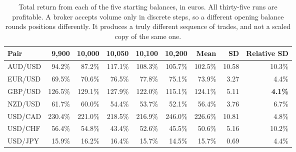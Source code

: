 \begin{table}[htb!]
\centering
\footnotesize
\caption{Total return from each of the five starting balances, in euros. All thirty-five runs are profitable. A broker accepts volume only in discrete steps, so a different opening balance rounds positions differently. It produces a truly different sequence of trades, and not a scaled copy of the same one.}
\label{Tables:PathRobustness}
\begin{tabular}{@{}lrrrrrrrr@{}}
\toprule
\textbf{Pair} & \textbf{9,900} & \textbf{10,000} & \textbf{10,050} & \textbf{10,100} & \textbf{10,200} & \textbf{Mean} & \textbf{SD} & \textbf{Relative SD} \\
\midrule
AUD/USD & 94.2\% & 87.2\% & 117.1\% & 108.3\% & 105.7\% & 102.5\% & 10.58 & 10.3\% \\
EUR/USD & 69.5\% & 70.6\% & 76.5\% & 77.8\% & 75.1\% & 73.9\% & 3.27 & 4.4\% \\
GBP/USD & 126.5\% & 129.1\% & 127.9\% & 122.0\% & 115.1\% & 124.1\% & 5.11 & \textbf{4.1\%} \\
NZD/USD & 61.7\% & 60.0\% & 54.4\% & 53.7\% & 52.1\% & 56.4\% & 3.76 & 6.7\% \\
USD/CAD & 230.4\% & 221.0\% & 218.5\% & 216.9\% & 246.0\% & 226.6\% & 10.81 & 4.8\% \\
USD/CHF & 56.4\% & 54.8\% & 43.4\% & 52.6\% & 45.5\% & 50.6\% & 5.16 & 10.2\% \\
USD/JPY & 15.9\% & 16.2\% & 16.4\% & 15.7\% & 14.5\% & 15.7\% & 0.69 & 4.4\% \\
\bottomrule
\end{tabular}
\end{table}